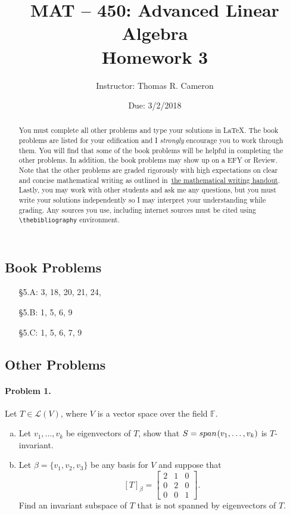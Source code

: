 \documentclass{article}
\title{MAT -- 450: Advanced Linear Algebra\\
\large{Homework 3}}
\author{Instructor: Thomas R. Cameron}
\date{Due: 3/2/2018}
\newcommand{\spn}{{span\mkern1mu}}
\begin{document}
\maketitle

\begin{abstract}
You must complete all other problems and type your solutions in \LaTeX. The book problems are listed for your edification and I \emph{strongly} encourage you to work through them. You will find that some of the book problems will be helpful in completing the other problems. In addition, the book problems may show up on a EFY or Review. Note that the other problems are graded rigorously with high expectations on clear and concise mathematical writing as outlined in~\href{https://www.thomasrcameron.com/courses/MAT-450/handouts/math_writing.pdf}{the mathematical writing handout}. Lastly, you may work with other students and ask me any questions, but you must write your solutions independently so I may interpret your understanding while grading. Any sources you use, including internet sources must be cited using {\verb+\thebibliography+} environment. 
\end{abstract}

\subsection*{Book Problems}
\begin{itemize}
\item   [\S 5.A:] 3, 18, 20, 21, 24, 
\item   [\S 5.B:] 1, 5, 6, 9
\item   [\S 5.C:] 1, 5, 6, 7, 9
\end{itemize}

\subsection*{Other Problems}

\paragraph*{Problem 1.} Let $T\in\mathcal{L}(V)$, where $V$ is a vector space over the field $\mathbb{F}$.
\begin{enumerate}[a.]
\item	Let $v_{1},\ldots,v_{k}$ be eigenvectors of $T$, show that $S=\spn(v_{1},\ldots,v_{k})$ is $T$-invariant. 
\item	Let $\beta=\{v_{1},v_{2},v_{3}\}$ be any basis for $V$ and suppose that
\[
[T]_{\beta}=\begin{bmatrix}2 & 1 & 0\\0 & 2 & 0\\0 & 0 & 1\end{bmatrix}.
\]
Find an invariant subspace of $T$ that is not spanned by eigenvectors of $T$. 
\end{enumerate}
\end{document}
